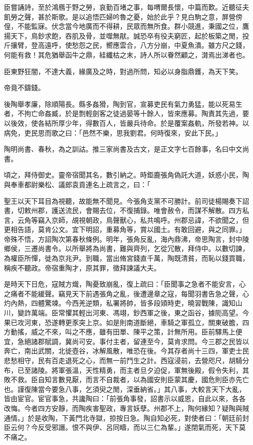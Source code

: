\begin{pinyinscope}
臣嘗誦詩，至於鴻鴈于野之勞，哀勤百堵之事，每喟爾長懷，中篇而歎。近聽征夫飢勞之聲，甚於斯歌。是以追悟匹婦吟魯之憂，始於此乎？見白駒之意，屏營傍偟，不能監寐。伏念當今地廣而不得耕，民眾而無所食。群小競進，秉國之位，鷹揚天下，鳥鈔求飽，吞肌及骨，並噬無猒。誠恐卒有役夫窮匠，起於板築之閒，投斤攘臂，登高遠呼，使愁怨之民，嚮應雲合，八方分崩，中夏魚潰。雖方尺之錢，何能有救！其危猶舉函牛之鼎，絓纖枯之末，詩人所以眷然顧之，潸焉出涕者也。

臣東野狂闇，不達大義，緣廣及之時，對過所問，知必以身脂鼎鑊，為天下笑。

帝竟不鑄錢。

後陶舉孝廉，除順陽長。縣多姦猾，陶到官，宣募吏民有氣力勇猛，能以死易生者，不拘亡命姦臧，於是剽輕劍客之徒過晏等十餘人，皆來應募。陶責其先過，要以後效，使各結所厚少年，得數百人，皆嚴兵待命。於是覆案姦軌，所發若神。以病免，吏民思而歌之曰：「邑然不樂，思我劉君。何時復來，安此下民。」

陶明尚書、春秋，為之訓詁。推三家尚書及古文，是正文字七百餘事，名曰中文尚書。

頃之，拜侍御史。靈帝宿聞其名，數引納之。時鉅鹿張角偽託大道，妖惑小民，陶與奉車都尉樂松、議郎袁貢連名上疏言之，曰：「

聖王以天下耳目為視聽，故能無不聞見。今張角支黨不可勝計。前司徒楊賜奏下詔書，切敕州郡，護送流民，會賜去位，不復捕錄。唯會赦令，而謀不解散。四方私言，云角等竊入京師，覘視朝政，鳥聲獸心，私共鳴呼。州郡忌諱，不欲聞之，但更相告語，莫肯公文。宜下明詔，重募角等，賞以國土。有敢回避，與之同罪。」帝殊不悟，方詔陶次第春秋條例。明年，張角反亂，海內鼎沸，帝思陶言，封中陵鄉侯，三遷尚書令。以所舉將為尚書，難與齊列，乞從冗散，拜侍中。以數切諫，為權臣所憚，徙為京兆尹。到職，當出脩宮錢直千萬，陶既清貧，而恥以錢買職，稱疾不聽政。帝宿重陶才，原其罪，徵拜諫議大夫。

是時天下日危，寇賊方熾，陶憂致崩亂，復上疏曰：「臣聞事之急者不能安言，心之痛者不能緩聲。竊見天下前遇張角之亂，後遭邊章之寇，每聞羽書告急之聲，心灼內熱，四體驚竦。今西羌逆類，私署將帥，皆多段熲時吏，曉習戰陳，識知山川，變詐萬端。臣常懼其輕出河東、馮翊，鈔西軍之後，東之函谷，據阨高望。今果已攻河東，恐遂轉更豕突上京。如是則南道斷絕，車騎之軍孤立，關東破膽，四方動搖，威之不來，叫之不應，雖有田單、陳平之策，計無所用。臣前驛馬上便宜，急絕諸郡賦調，冀尚可安。事付主者，留連至今，莫肯求問。今三郡之民皆以奔亡，南出武關，北徙壺谷，冰解風散，唯恐在後。今其存者尚十三四，軍吏士民悲愁相守，民有百走退死之心，而無一前鬥生之計。西寇浸前，去營咫尺，胡騎分布，已至諸陵。將軍張溫，天性精勇，而主者旦夕迫促，軍無後殿，假令失利，其敗不救。臣自知言數見厭，而言不自裁者，以為國安則臣蒙其慶，國危則臣亦先亡也。謹復陳當今要急八事，乞須臾之閒，深垂納省。」其八事，大較言天下大亂，皆由宦官。宦官事急，共讒陶曰：「前張角事發，詔書示以威恩，自此以來，各各改悔。今者四方安靜，而陶疾害聖政，專言妖孽。州郡不上，陶何緣知？疑陶與賊通情。」於是收陶，下黃門北寺獄，掠按日急。陶自知必死，對使者曰：「朝廷前封臣云何？今反受邪譖。恨不與伊、呂同疇，而以三仁為輩。」遂閉氣而死，天下莫不痛之。


\end{pinyinscope}
